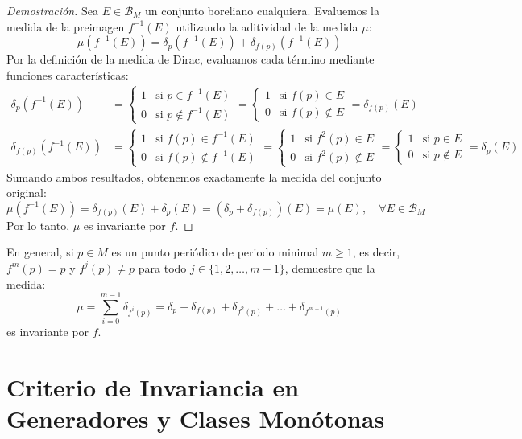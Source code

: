 \begin{proof}[Demostración]
	Sea $E \in \mathcal{B}_M$ un conjunto boreliano cualquiera. Evaluemos la medida de la preimagen $f^{-1}(E)$ utilizando la aditividad de la medida $\mu$:
	$$ \mu(f^{-1}(E)) = \delta_p(f^{-1}(E)) + \delta_{f(p)}(f^{-1}(E)) $$
	Por la definición de la medida de Dirac, evaluamos cada término mediante funciones características:
	\begin{align*}
		\delta_p(f^{-1}(E)) &= \begin{cases} 1 & \text{si } p \in f^{-1}(E) \\ 0 & \text{si } p \notin f^{-1}(E) \end{cases} = \begin{cases} 1 & \text{si } f(p) \in E \\ 0 & \text{si } f(p) \notin E \end{cases} = \delta_{f(p)}(E) \\[0.3cm]
		\delta_{f(p)}(f^{-1}(E)) &= \begin{cases} 1 & \text{si } f(p) \in f^{-1}(E) \\ 0 & \text{si } f(p) \notin f^{-1}(E) \end{cases} = \begin{cases} 1 & \text{si } f^2(p) \in E \\ 0 & \text{si } f^2(p) \notin E \end{cases} = \begin{cases} 1 & \text{si } p \in E \\ 0 & \text{si } p \notin E \end{cases} = \delta_p(E)
	\end{align*}
	Sumando ambos resultados, obtenemos exactamente la medida del conjunto original:
	$$ \mu(f^{-1}(E)) = \delta_{f(p)}(E) + \delta_p(E) = (\delta_p + \delta_{f(p)})(E) = \mu(E), \quad \forall E \in \mathcal{B}_M $$
	Por lo tanto, $\mu$ es invariante por $f$.
\end{proof}

\begin{ejercicio}
	En general, si $p \in M$ es un punto periódico de periodo minimal $m \ge 1$, es decir, $f^m(p) = p$ y $f^j(p) \neq p$ para todo $j \in \{1, 2, \dots, m-1\}$, demuestre que la medida:
	$$ \mu = \sum_{i=0}^{m-1} \delta_{f^i(p)} = \delta_p + \delta_{f(p)} + \delta_{f^2(p)} + \dots + \delta_{f^{m-1}(p)} $$
	es invariante por $f$.
\end{ejercicio}

\section{Criterio de Invariancia en Generadores y Clases Monótonas}

